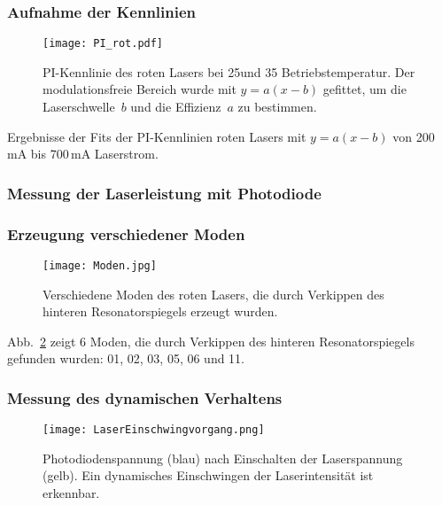 \subsubsection{Aufnahme der Kennlinien}


\begin{figure}[H]
\begin{center}
  \texttt{[image: PI\_rot.pdf]}
  \caption{PI-Kennlinie des roten Lasers bei 25\grad und 35\grad
  Betriebstemperatur. Der modulationsfreie Bereich wurde mit $y=a(x-b)$
  gefittet, um die Laserschwelle~$b$ und die Effizienz~$a$ zu bestimmen.}
  \label{img:PI_rot}
\end{center}
\end{figure}


\begin{table}[htb]
\caption{Ergebnisse der Fits der PI-Kennlinien roten Lasers mit $y=a(x-b)$ von 200\,mA bis
700\,mA Laserstrom.}

\label{tab:Fits_PI_rot}
\end{table}

\FloatBarrier

\subsubsection{Messung der Laserleistung mit Photodiode}



\subsubsection{Erzeugung verschiedener Moden}

\begin{figure}[H]
\begin{center}
  \texttt{[image: Moden.jpg]}
  \caption{Verschiedene Moden des roten Lasers, die durch Verkippen des hinteren Resonatorspiegels
  erzeugt wurden.}
  \label{img:moden}
\end{center}
\end{figure}

Abb.~\ref{img:moden} zeigt 6 Moden, die durch Verkippen des hinteren Resonatorspiegels gefunden
wurden: 01, 02, 03, 05, 06 und 11.


\subsubsection{Messung des dynamischen Verhaltens}

\begin{figure}[H]
\begin{center}
  \texttt{[image: LaserEinschwingvorgang.png]}
  \caption{Photodiodenspannung (blau) nach Einschalten der Laserspannung (gelb).
  Ein dynamisches Einschwingen der Laserintensität ist erkennbar.}
  \label{img:Einschwingen}
\end{center}
\end{figure}